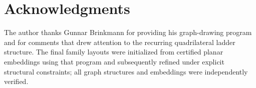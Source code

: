 \section*{Acknowledgments}

The author thanks Gunnar Brinkmann for providing his graph-drawing program and
for comments that drew attention to the recurring quadrilateral ladder
structure.  The final family layouts were initialized from certified planar
embeddings using that program and subsequently refined under explicit
structural constraints; all graph structures and embeddings were independently
verified.
